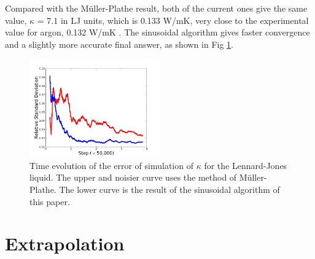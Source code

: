 \documentclass[aps,prb,twocolumn,showpacs,superscriptaddress]{revtex4-1}\begin{tiny}\end{tiny}
\begin{document}
Compared with the M\"uller-Plathe \cite{FMP} result, both of the current ones give the same
value, $\kappa$ = 7.1 in LJ units, which is  0.133 W/mK, very close to the experimental
value for argon, 0.132 W/mK \cite{Younglove,argonk}.  The sinusoidal algorithm gives
faster convergence and a slightly more accurate final answer, as shown in
Fig \ref{fig:error}.

\par
\begin{figure}[top]
\includegraphics[angle=0,width=0.5\textwidth]{RelativeError2.png}
\caption{\label{fig:error} Time evolution of the error of simulation of $\kappa$ for the
Lennard-Jones liquid.  The upper and noisier curve uses the method of M\"uller-Plathe.
The lower curve is the result of the sinusoidal algorithm of this paper.}
\label{fig:error}
\end{figure}
\par






\section{Extrapolation}
\end{document}
